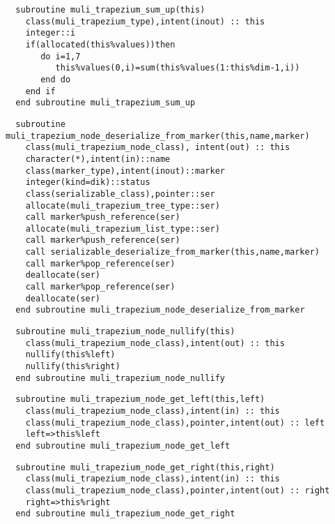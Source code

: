 \begin{Verbatim}
  subroutine muli_trapezium_sum_up(this)
    class(muli_trapezium_type),intent(inout) :: this
    integer::i
    if(allocated(this%values))then
       do i=1,7
          this%values(0,i)=sum(this%values(1:this%dim-1,i))
       end do
    end if
  end subroutine muli_trapezium_sum_up
\end{Verbatim}
\begin{Verbatim}
  subroutine muli_trapezium_node_deserialize_from_marker(this,name,marker)
    class(muli_trapezium_node_class), intent(out) :: this
    character(*),intent(in)::name
    class(marker_type),intent(inout)::marker
    integer(kind=dik)::status
    class(serializable_class),pointer::ser
    allocate(muli_trapezium_tree_type::ser)
    call marker%push_reference(ser)
    allocate(muli_trapezium_list_type::ser)
    call marker%push_reference(ser)
    call serializable_deserialize_from_marker(this,name,marker)
    call marker%pop_reference(ser)
    deallocate(ser)
    call marker%pop_reference(ser)
    deallocate(ser)
  end subroutine muli_trapezium_node_deserialize_from_marker
\end{Verbatim}

\begin{Verbatim}
  subroutine muli_trapezium_node_nullify(this)
    class(muli_trapezium_node_class),intent(out) :: this
    nullify(this%left)
    nullify(this%right)
  end subroutine muli_trapezium_node_nullify
\end{Verbatim}

\begin{Verbatim}
  subroutine muli_trapezium_node_get_left(this,left)
    class(muli_trapezium_node_class),intent(in) :: this
    class(muli_trapezium_node_class),pointer,intent(out) :: left
    left=>this%left
  end subroutine muli_trapezium_node_get_left
\end{Verbatim}

\begin{Verbatim}
  subroutine muli_trapezium_node_get_right(this,right)
    class(muli_trapezium_node_class),intent(in) :: this
    class(muli_trapezium_node_class),pointer,intent(out) :: right
    right=>this%right
  end subroutine muli_trapezium_node_get_right
\end{Verbatim}

